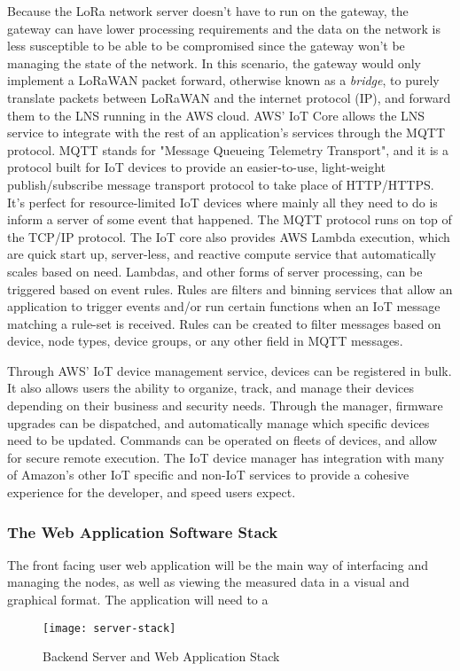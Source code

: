 Because the LoRa network server doesn't have to run on the gateway, the gateway
can have lower processing requirements and the data on the network is  less
susceptible to be able to be compromised since the gateway won't be managing the
state of the network. In this scenario, the gateway would only implement a
LoRaWAN packet forward, otherwise known as a \emph{bridge}, to purely translate
packets between LoRaWAN and the internet protocol (IP), and forward them to the
LNS running in the AWS cloud. AWS' IoT Core allows the LNS service to integrate
with the rest of an application's services through the MQTT protocol. MQTT
stands for "Message Queueing Telemetry Transport", and it is a protocol built
for IoT devices to provide an easier-to-use, light-weight publish/subscribe
message transport protocol to take place of HTTP/HTTPS. It's perfect for
resource-limited IoT devices where mainly all they need to do is inform a server
of some event that happened. The MQTT protocol runs on top of the TCP/IP
protocol. The IoT core also provides AWS Lambda execution, which are quick start
up, server-less, and reactive compute service that automatically scales based on
need. Lambdas, and other forms of server processing, can be triggered based on
event rules. Rules are filters and binning services that allow an application to
trigger events and/or run certain functions when an IoT message matching a
rule-set is received. Rules can be created to filter messages based on device,
node types, device groups, or any other field in MQTT messages.


Through AWS' IoT device management service, devices can be registered in bulk.
It also allows users the ability to organize, track, and manage their devices
depending on their business and security needs. Through the manager, firmware
upgrades can be dispatched, and automatically manage which specific devices need
to be updated. Commands can be operated on fleets of devices, and allow for
secure remote execution. The IoT device manager has integration with many of
Amazon's other IoT specific and non-IoT services to provide a cohesive
experience for the developer, and speed users expect.



\subsubsection{The Web Application Software Stack}
The front facing user web application will be the main way of interfacing and managing the nodes, as well as viewing the measured data in a visual and graphical format. The application will need to a

\begin{figure}
  \centering
  \texttt{[image: server-stack]}
  \caption{Backend Server and Web Application Stack}
  \label{server-stack}
\end{figure}
